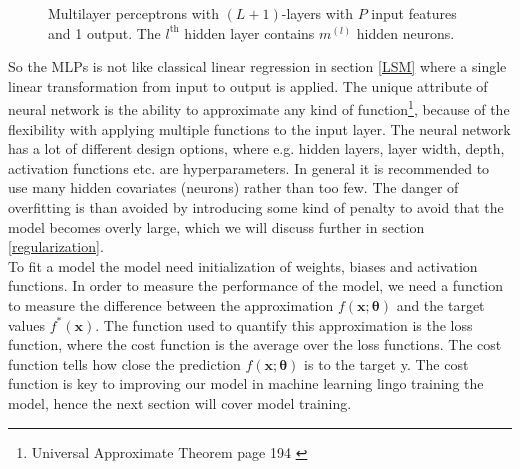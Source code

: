 \begin{figure}[th]
	\caption[Multilayer perceptrons with $(L+1)$-layers]{Multilayer perceptrons with $(L+1)$-layers with $P$ input features and 1 output. The $l^{\text{th}}$ hidden layer contains $m^{(l)}$ hidden neurons.}
	\label{fig:multilayer-perceptron}
\end{figure}

So the MLPs is not like classical linear regression in section \ref{LSM} where a single linear transformation from input to output is applied. The unique attribute of neural network is the ability to approximate any kind of function\footnote{Universal Approximate Theorem page 194 \parencite{Goodfellow-et-al-2016}}, because of the flexibility with applying multiple functions to the input layer. The neural network has a lot of different design options, where e.g. hidden layers, layer width, depth, activation functions etc. are hyperparameters. In general it is recommended to use many hidden covariates (neurons) rather than too few. The danger of overfitting is than avoided by introducing some kind of penalty to avoid that the model becomes overly large, which we will discuss further in section \ref{regularization}.\\

To fit a model the model need initialization of weights, biases and activation functions. In order to measure the performance of the model, we need a function to measure the difference between the approximation $f(\bm{x};\bm{\theta})$ and the target values $f^*(\bm{x})$. The function used to quantify this approximation is the loss function, where the cost function is the average over the loss functions. The cost function tells how close the prediction $f(\bm{x};\bm{\theta})$ is to the target y. The cost function is key to improving our model in machine learning lingo training the model, hence the next section will cover model training.

